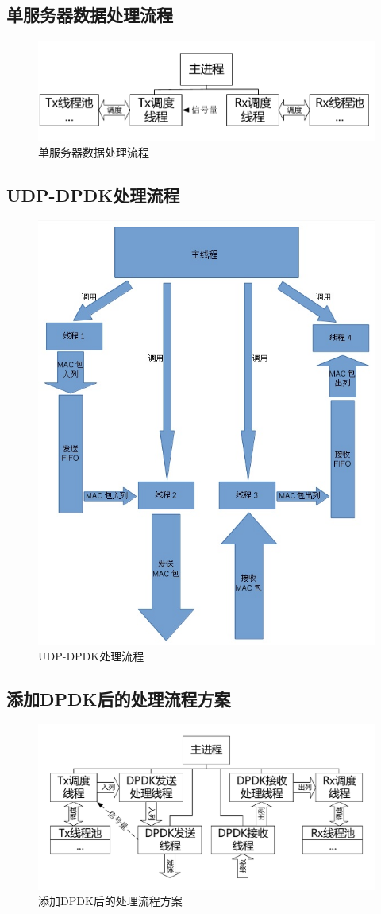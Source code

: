 \documentclass{article}
\begin{document}
\subsection{单服务器数据处理流程}
\begin{figure}[H]
	\centering
	\includegraphics[width = \textwidth]{frame_step1.pdf}
	\caption{单服务器数据处理流程}
\end{figure}

\subsection{UDP-DPDK处理流程}
\begin{figure}[H]
	\centering
	\includegraphics[width = .6\textwidth]{frame_dpdk.jpg}
	\caption{UDP-DPDK处理流程}
\end{figure}

\subsection{添加DPDK后的处理流程方案}
\begin{figure}[H]
	\centering
	\includegraphics[width = .8\textwidth]{frame_step2.pdf}
	\caption{添加DPDK后的处理流程方案}
\end{figure}
\end{document}
